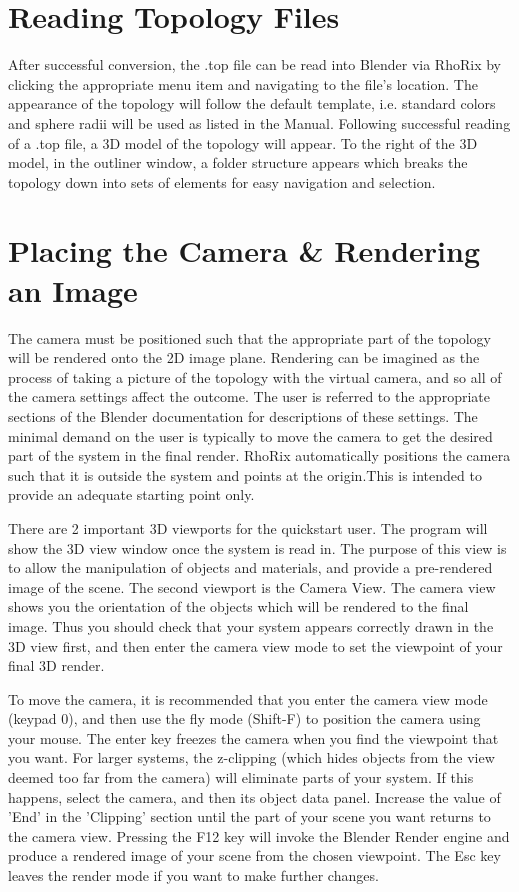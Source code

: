 \documentclass{tufte-handout}
\newcommand{\programName}{RhoRix}
\newcommand{\operatorPath}{File $\rightarrow$ Import $\rightarrow$ Quantum Chemical Topology (.top)}
\newcommand{\enterCamera}{keypad $0$}
\newcommand{\flyMode}{Shift-F}
\newcommand{\renderKey}{F12}
\newcommand{\leaveRender}{Esc}
\begin{document}
\section{Reading Topology Files}
After successful conversion, the .top file can be read into Blender via \programName{} by clicking the appropriate menu item\sidenote{\operatorPath{}} and navigating to the file's location.
The appearance of the topology will follow the default template, i.e. standard colors and sphere radii will be used as listed in the Manual.
Following successful reading of a .top file, a 3D model of the topology will appear. To the right of the 3D model, in the outliner window, a folder structure appears which breaks the topology down into sets of elements for easy navigation and selection.

\section{Placing the Camera \& Rendering an Image}
The camera must be positioned such that the appropriate part of the topology will be rendered onto the 2D image plane.
Rendering can be imagined as the process of taking a picture of the topology with the virtual camera, and so all of the camera settings affect the outcome. 
The user is referred to the appropriate sections of the Blender documentation for descriptions of these settings.
The minimal demand on the user is typically to move the camera to get the desired part of the system in the final 
render.
\programName{} automatically positions the camera such that it is outside the system and points at the origin.This is intended to provide an adequate starting point only.
\par{}
There are 2 important 3D viewports for the quickstart user. The program will show the 3D view window once the 
system is read in.
The purpose of this view is to allow the manipulation of objects and materials, and provide a pre-rendered image 
of the scene.
The second viewport is the Camera View. The camera view shows you the orientation of the objects which will be rendered to the final image.
Thus you should check that your system appears correctly drawn in the 3D view first, and then enter the camera 
view mode to set the viewpoint of your final 3D render.
\par{}
To move the camera, it is recommended that you enter the camera view mode (\enterCamera{}), and then use the fly mode (\flyMode{}) to position the camera using your mouse.
The enter key freezes the camera when you find the viewpoint that you want.
For larger systems, the z-clipping (which hides objects from the view deemed too far from the camera) will 
eliminate parts of your system.
If this happens, select the camera, and then its object data panel.
Increase the value of 'End' in the 'Clipping' section until the part of your scene you want returns to the camera view.
Pressing the \renderKey{} key will invoke the Blender Render engine and produce a rendered image of your scene from the chosen viewpoint.
The \leaveRender{} key leaves the render mode if you want to make further changes.
\end{document}
